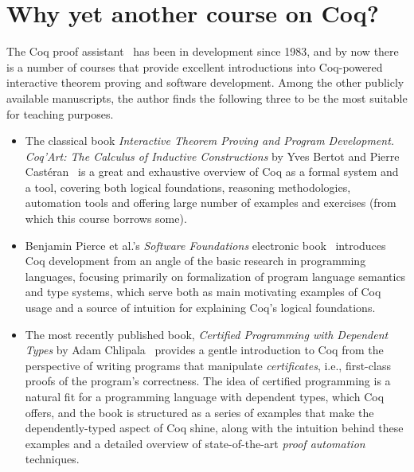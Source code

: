 \section{Why yet another course on Coq?}




The Coq proof assistant~\cite{Coq-manual} has been in development
since 1983, and by now there is a number of courses that provide
excellent introductions into Coq-powered interactive theorem proving
and software development. Among the other publicly available
manuscripts, the author finds the following three to be the most
suitable for teaching purposes.



\begin{itemize}
\item  The classical book \textit{Interactive Theorem Proving and Program
  Development. Coq'Art: The Calculus of Inductive Constructions} by
  Yves Bertot and Pierre Cast\'{e}ran~\cite{Bertot-Casteran:BOOK} is
  a great and exhaustive overview of Coq as a formal system and a
  tool, covering both logical foundations, reasoning methodologies,
  automation tools and offering large number of examples and
  exercises (from which this course borrows some).



\item  Benjamin Pierce et al.'s \textit{Software Foundations} electronic book~\cite{Pierce-al:SF} introduces Coq development from an angle of the basic research in programming languages, focusing primarily on formalization of program language semantics and type systems, which serve both as main motivating examples of Coq usage and a source of intuition for explaining Coq's logical foundations.



\item  The most recently published book, \textit{Certified Programming with Dependent Types} by Adam Chlipala~\cite{Chlipala:BOOK} provides a gentle introduction to Coq from the perspective of writing programs that manipulate \textit{certificates}, i.e., first-class proofs of the program's correctness. The idea of certified programming is a natural fit for a programming language with dependent types, which Coq offers, and the book is structured as a series of examples that make the dependently-typed aspect of Coq shine, along with the intuition behind these examples and a detailed overview of state-of-the-art \textit{proof automation} techniques.

\end{itemize}


